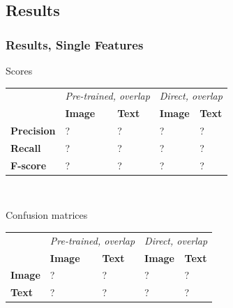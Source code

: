 \subsection{Results}


\begin{frame}
\frametitle{Results, Single Features}

\begin{block}{Scores}
\begin{tabular}{l l l  | l l}
 & \multicolumn{2}{c}{\emph{Pre-trained, overlap}} & \multicolumn{2}{c}{\emph{Direct, overlap}} \\
& \textbf{Image} & \textbf{Text} & \textbf{Image} & \textbf{Text} \\
\textbf{Precision} & ? & ? & ? & ? \\
\textbf{Recall} & ? & ? & ? & ? \\
\textbf{F-score} & ? & ? & ? & ? 
\end{tabular} \\
\end{block}

\begin{block}{Confusion matrices}
\begin{tabular}{l l l | l l }
& \multicolumn{2}{c}{\emph{Pre-trained, overlap}} & \multicolumn{2}{c}{\emph{Direct, overlap}} \\
 & \textbf{Image} & \textbf{Text} & \textbf{Image} & \textbf{Text} \\
\textbf{Image} & ? & ? & ? & ? \\
\textbf{Text} & ? & ? & ? & ?
\end{tabular}
\end{block}
\end{frame}


